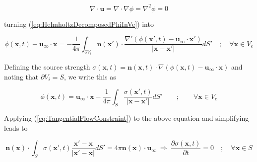 \documentclass{article}
\begin{document}
\begin{equation}
\label{eq:IncompressiblePotentialFlowEquation}
	\nabla \cdot \mathbf{u} = \nabla \cdot \nabla \phi = \nabla^2 \phi = 0
\end{equation}

turning (\ref{eq:HelmholtzDecomposedPhiInVe}) into

\begin{equation*}
	\phi(\mathbf{x}, t) - \mathbf{u}_{\infty} \cdot \mathbf{x} = - \frac{1}{4
	\pi} \int_{\partial V_i} \mathbf{n}(\mathbf{x}') \cdot \frac{\nabla' \left(
	\phi(\mathbf{x}', t) - \mathbf{u}_{\infty} \cdot \mathbf{x}' \right)}{|
	\mathbf{x} - \mathbf{x}'|} dS' \quad ; \quad \forall \mathbf{x} \in V_e
\end{equation*}

Defining the source strength $\sigma(\mathbf{x}, t) = \mathbf{n}(\mathbf{x}, t)
\cdot \nabla \left( \phi(\mathbf{x}, t) - \mathbf{u}_{\infty} \cdot \mathbf{x}
\right)$ and noting that $\partial V_i = S$, we write this as

\begin{equation*}
	\phi(\mathbf{x}, t) = \mathbf{u}_{\infty} \cdot \mathbf{x} - \frac{1}{4 \pi}
	\int_S \frac{\sigma(\mathbf{x}', t)}{|\mathbf{x} - \mathbf{x}'|} dS' \qquad
	; \qquad \forall \mathbf{x} \in V_e
\end{equation*}

Applying (\ref{eq:TangentialFlowConstraint}) to the above equation and
simplifying leads to

\begin{equation}
\label{eq:IncompressibleSourcePanelMethodEquation}
	\mathbf{n}(\mathbf{x}) \cdot \int_S \sigma(\mathbf{x}', t) \frac{\mathbf{x}'
	- \mathbf{x}}{|\mathbf{x}' - \mathbf{x}|} dS' = 4 \pi \mathbf{n}(\mathbf{x})
	\cdot \mathbf{u}_{\infty} \: \Rightarrow \: \frac{\partial \sigma(
	\mathbf{x}, t)}{\partial t} = 0 \quad ; \quad \forall \mathbf{x} \in S
\end{equation}
\end{document}
